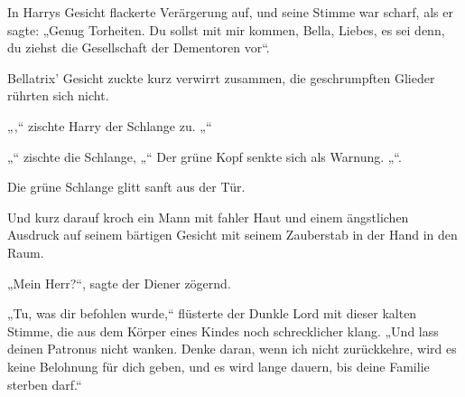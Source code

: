 In Harrys Gesicht flackerte Verärgerung auf, und seine Stimme war scharf, als er sagte: „Genug Torheiten. Du sollst mit mir kommen, Bella, Liebes, es sei denn, du ziehst die Gesellschaft der Dementoren vor“.

Bellatrix' Gesicht zuckte kurz verwirrt zusammen, die geschrumpften Glieder rührten sich nicht.

„,“ zischte Harry der Schlange zu. „“

„“ zischte die Schlange, „“ Der grüne Kopf senkte sich als Warnung. „“.

Die grüne Schlange glitt sanft aus der Tür.

Und kurz darauf kroch ein Mann mit fahler Haut und einem ängstlichen Ausdruck auf seinem bärtigen Gesicht mit seinem Zauberstab in der Hand in den Raum.

„Mein Herr?“, sagte der Diener zögernd.

„Tu, was dir befohlen wurde,“ flüsterte der Dunkle Lord mit dieser kalten Stimme, die aus dem Körper eines Kindes noch schrecklicher klang. „Und lass deinen Patronus nicht wanken. Denke daran, wenn ich nicht zurückkehre, wird es keine Belohnung für dich geben, und es wird lange dauern, bis deine Familie sterben darf.“

